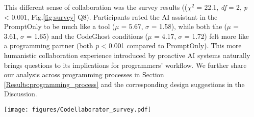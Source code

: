 This different sense of collaboration was  the survey results ((\textit{$\chi^2$} = 22.1, \textit{df} = 2, \textit{p} < 0.001, Fig.\ref{fig:survey} Q8).
Participants rated the AI assistant in the PromptOnly to be much like a tool ($\mu$ = 5.67, $\sigma$ = 1.58), while both the \sys{} ($\mu$ = 3.61, $\sigma$ = 1.65) and the CodeGhost conditions ($\mu$ = 4.17, $\sigma$ = 1.72) felt more like a programming partner (both \textit{p} < 0.001 compared to PromptOnly).
This more humanistic collaboration experience introduced by proactive AI systems naturally brings questions to its implications for programmers' workflow. We further share our analysis across programming processes in Section \ref{Results:programming_process} and the corresponding design suggestions in the Discussion.



\begin{figure*}[]

\centering
\texttt{[image: figures/Codellaborator\_survey.pdf]}
\caption{\textbf{Likert-scale Response displayed in box and whisker plots comparing three conditions}. \textnormal{Anchors are 1 - Strongly disagree and 7 - Strongly agree. The green dotted lines represent the mean values for each question. Using the Friedman test, we identified significant differences in rating in Q1 for disruption, Q5 for awareness, and Q8 for partner versus tool use experience.}}
\label{fig:survey}
\end{figure*}



